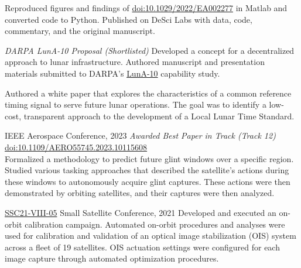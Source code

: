 \documentclass[10pt,final,sans]{resume}
\begin{document}
Reproduced figures and findings of \href{https://doi.org/10.1029/2022/EA002277}{doi:10.1029/2022/EA002277} in Matlab and converted code to Python. Published on DeSci Labs with data, code, commentary, and the original manuscript.

{\it DARPA LunA-10 Proposal (Shortlisted)}
Developed a concept for a decentralized approach to lunar infrastructure. Authored manuscript and presentation materials submitted to DARPA's \href{https://www.darpa.mil/news-events/2023-08-15}{LunA-10} capability study.

Authored a white paper that explores the characteristics of a common reference timing signal to serve future lunar operations. The goal was to identify a low-cost, transparent approach to the development of a Local Lunar Time Standard.

{IEEE Aerospace Conference, 2023}
{\it Awarded Best Paper in Track (Track 12)} \href{https://doi.org/10.1109/AERO55745.2023.10115608}{doi:10.1109/AERO55745.2023.10115608} \\
Formalized a methodology to predict future glint windows over a specific region. Studied various tasking approaches that described the satellite's actions during these windows to autonomously acquire glint captures. These actions were then demonstrated by orbiting satellites, and their captures were then analyzed.

{\href{https://digitalcommons.usu.edu/smallsat/2021/all2021/189/}{SSC21-VIII-05}}
{Small Satellite Conference, 2021}
Developed and executed an on-orbit calibration campaign. Automated on-orbit procedures and analyses were used for calibration and validation of an optical image stabilization (OIS) system across a fleet of 19 satellites. OIS actuation settings were configured for each image capture through automated optimization procedures.
\end{document}
